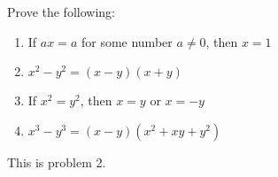 \begin{pr}
  Prove the following:
  \begin{enumerate}[label=(\roman*)]
    \item If $ax=a$ for some number $a\neq0$, then
    $x=1$
    \item $x^2-y^2=(x-y)(x+y)$
    \item If $x^2=y^2$, then $x=y$ or $x=-y$
    \item $x^3-y^3=(x-y)(x^2+xy+y^2)$
  \end{enumerate}
\end{pr}

\begin{pr}
  This is problem 2.
\end{pr}
